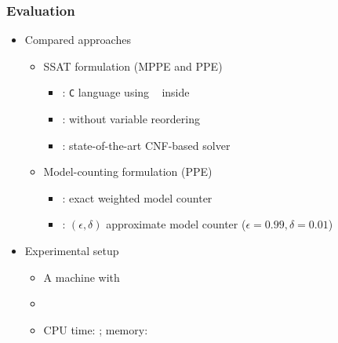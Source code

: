 \begin{frame}
    \frametitle{Evaluation}
    \begin{itemize}
        \item Compared approaches
              \pause
              \begin{itemize}
                  \item SSAT formulation (MPPE and PPE)
                        \pause
                        \begin{itemize}
                            \item \bddsp: \texttt{C} language using \cudd~\cite{CUDD} inside \abc~\cite{ABC}
                                  \pause
                            \item \bddspnr: \bddsp without variable reordering
                                  \pause
                            \item \dcssat: state-of-the-art CNF-based solver
                                  \pause
                        \end{itemize}
                  \item Model-counting formulation (PPE)
                        \pause
                        \begin{itemize}
                            \item \cachet: exact weighted model counter
                                  \pause
                            \item \approxmc: $(\epsilon,\delta)$ approximate model counter ($\epsilon=0.99,\delta=0.01$)
                                  \pause
                        \end{itemize}
              \end{itemize}
        \item Experimental setup
              \pause
              \begin{itemize}
                  \item A machine with~\machineSpec
                        \pause
                  \item \osInfo
                        \pause
                  \item CPU time: \timelimit; memory: \memlimit
              \end{itemize}
    \end{itemize}
\end{frame}

